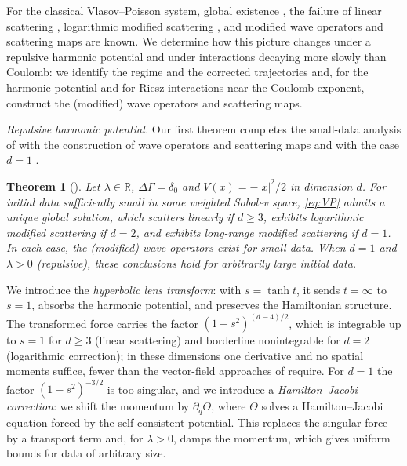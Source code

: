 \documentclass[10pt,reqno]{amsart}
\newtheorem{theorem}{Theorem}
\theoremstyle{definition}
\def\pr{\partial}
\def\R{\mathbb{R}}
\begin{document}
For the classical Vlasov--Poisson system, global existence \cite{BD85,LP91,P92}, the failure of linear scattering \cite{CH11}, logarithmic modified scattering \cite{CK16,IPWW22}, and modified wave operators and scattering maps \cite{FOPW21} are known. We determine how this picture changes under a repulsive harmonic potential and under interactions decaying more slowly than Coulomb: we identify the regime and the corrected trajectories and, for the harmonic potential and for Riesz interactions near the Coulomb exponent, construct the (modified) wave operators and scattering maps.
 
\smallskip
 
\noindent\emph{Repulsive harmonic potential.} Our first theorem completes the small-data analysis of \cite{VV24,BVV25} with the construction of wave operators and scattering maps \cite{HK26} and with the case $d=1$ \cite{H26}.
\begin{theorem}[\cite{H26,HK26}]\label{thm:VPH}
Let $\lambda\in\R$, $\Delta\Gamma=\delta_0$ and $V(x)=-|x|^2/2$ in dimension $d$. For initial data sufficiently small in some weighted Sobolev space, \eqref{eq:VP} admits a unique global solution, which scatters linearly if $d\geq3$, exhibits logarithmic modified scattering if $d=2$, and exhibits long-range modified scattering if $d=1$. In each case, the (modified) wave operators exist for small data. When $d=1$ and $\lambda>0$ (repulsive), these conclusions hold for \emph{arbitrarily large} initial data.
\end{theorem}
We introduce the \emph{hyperbolic lens transform}: with $s=\tanh t$, it sends $t=\infty$ to $s=1$, absorbs the harmonic potential, and preserves the Hamiltonian structure. The transformed force carries the factor $(1-s^2)^{(d-4)/2}$, which is integrable up to $s=1$ for $d\geq3$ (linear scattering) and borderline nonintegrable for $d=2$ (logarithmic correction); in these dimensions one derivative and no spatial moments suffice, fewer than the vector-field approaches of \cite{VV24,BVV25} require. For $d=1$ the factor $(1-s^2)^{-3/2}$ is too singular, and we introduce a \emph{Hamilton--Jacobi correction}: we shift the momentum by $\pr_q\Theta$, where $\Theta$ solves a Hamilton--Jacobi equation forced by the self-consistent potential. This replaces the singular force by a transport term and, for $\lambda>0$, damps the momentum, which gives uniform bounds for data of arbitrary size.
 
\smallskip
 
\end{document}
